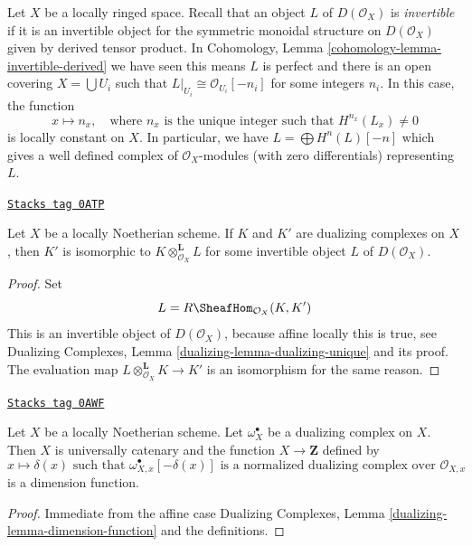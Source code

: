 Let $X$ be a locally ringed space. Recall that an object $L$ of
$D(\mathcal{O}_X)$ is {\it invertible} if it is an invertible object
for the symmetric monoidal structure on $D(\mathcal{O}_X)$ given
by derived tensor product. In
Cohomology, Lemma \ref{cohomology-lemma-invertible-derived}
we have seen this means $L$ is perfect and there is an open covering
$X = \bigcup U_i$ such that $L|_{U_i} \cong \mathcal{O}_{U_i}[-n_i]$
for some integers $n_i$. In this case, the function
$$
x \mapsto n_x,\quad
\text{where }n_x\text{ is the unique integer such that }
H^{n_x}(L_x) \not = 0
$$
is locally constant on $X$. In particular, we have
$L = \bigoplus H^n(L)[-n]$ which gives a well defined complex of
$\mathcal{O}_X$-modules (with zero differentials) representing $L$.

\begin{lemma}
\label{duality-lemma-dualizing-unique-schemes}
\href{https://stacks.math.columbia.edu/tag/0ATP}{\texttt{Stacks tag 0ATP}}

Let $X$ be a locally Noetherian scheme. If $K$ and $K'$ are dualizing
complexes on $X$, then $K'$ is isomorphic to
$K \otimes_{\mathcal{O}_X}^\mathbf{L} L$
for some invertible object $L$ of $D(\mathcal{O}_X)$.
\end{lemma}

\begin{proof}
Set
$$
L = R\SheafHom_{\mathcal{O}_X}(K, K')
$$
This is an invertible object of $D(\mathcal{O}_X)$, because affine locally
this is true, see Dualizing Complexes, Lemma
\ref{dualizing-lemma-dualizing-unique} and its proof.
The evaluation map $L \otimes_{\mathcal{O}_X}^\mathbf{L} K \to K'$
is an isomorphism for the same reason.
\end{proof}

\begin{lemma}
\label{duality-lemma-dimension-function-scheme}
\href{https://stacks.math.columbia.edu/tag/0AWF}{\texttt{Stacks tag 0AWF}}

Let $X$ be a locally Noetherian scheme. Let $\omega_X^\bullet$
be a dualizing complex on $X$. Then $X$ is universally catenary
and the function
$X \to \mathbf{Z}$ defined by
$$
x \longmapsto \delta(x)\text{ such that }
\omega_{X, x}^\bullet[-\delta(x)]
\text{ is a normalized dualizing complex over }
\mathcal{O}_{X, x}
$$
is a dimension function.
\end{lemma}

\begin{proof}
Immediate from the affine case
Dualizing Complexes, Lemma \ref{dualizing-lemma-dimension-function}
and the definitions.
\end{proof}

